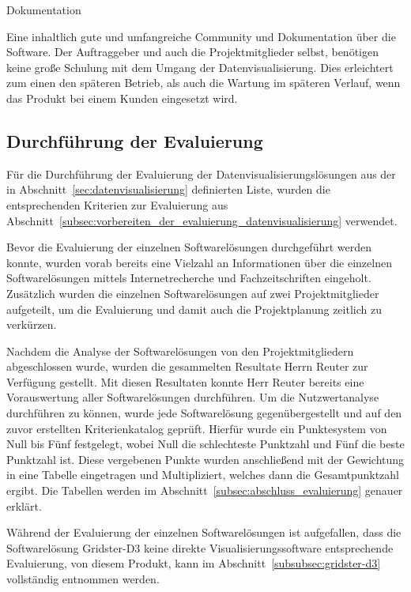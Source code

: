 {Dokumentation
\begin{outline}
  \1 Eine inhaltlich gute und umfangreiche Community und Dokumentation über die
  Software. Der Auftraggeber und auch die Projektmitglieder selbst, benötigen
  keine große Schulung mit dem Umgang der Datenvisualisierung. Dies erleichtert
  zum einen den späteren Betrieb, als auch die Wartung im späteren Verlauf,
  wenn das Produkt bei einem Kunden eingesetzt wird.
\end{outline}
\mr%

\subsection{Durchführung der Evaluierung}
\label{subsec:durchfuehrung_evaluierung_datenvisualisierung}
Für die Durchführung der Evaluierung der Datenvisualisierungslösungen aus der
in Abschnitt~\ref{sec:datenvisualisierung} definierten Liste, wurden die
entsprechenden Kriterien zur Evaluierung aus
Abschnitt~\ref{subsec:vorbereiten_der_evaluierung_datenvisualisierung}
verwendet.

Bevor die Evaluierung der einzelnen Softwarelösungen durchgeführt werden
konnte, wurden vorab bereits eine Vielzahl an Informationen über die einzelnen
Softwarelösungen mittels Internetrecherche und Fachzeitschriften eingeholt.
Zusätzlich wurden die einzelnen Softwarelösungen auf zwei Projektmitglieder
aufgeteilt, um die Evaluierung und damit auch die Projektplanung zeitlich zu
verkürzen.

Nachdem die Analyse der Softwarelösungen von den Projektmitgliedern
abgeschlossen wurde, wurden die gesammelten Resultate Herrn Reuter zur
Verfügung gestellt. Mit diesen Resultaten konnte Herr Reuter bereits eine
Vorauswertung aller Softwarelösungen durchführen. Um die Nutzwertanalyse
durchführen zu können, wurde jede Softwarelösung gegenübergestellt und auf den
zuvor erstellten Kriterienkatalog geprüft. Hierfür wurde ein Punktesystem von
Null bis Fünf festgelegt, wobei Null die schlechteste Punktzahl und Fünf die
beste Punktzahl ist. Diese vergebenen Punkte wurden anschließend mit der
Gewichtung in eine Tabelle eingetragen und Multipliziert, welches dann die
Gesamtpunktzahl ergibt.  Die Tabellen werden im
Abschnitt~\ref{subsec:abschluss_evaluierung} genauer erklärt.

Während der Evaluierung der einzelnen Softwarelösungen ist aufgefallen, dass
die Softwarelösung Gridster\hyp{}D3 keine direkte Visualisierungssoftware
entsprechende Evaluierung, von diesem Produkt, kann im
Abschnitt~\ref{subsubsec:gridster-d3} vollständig entnommen werden.

}
